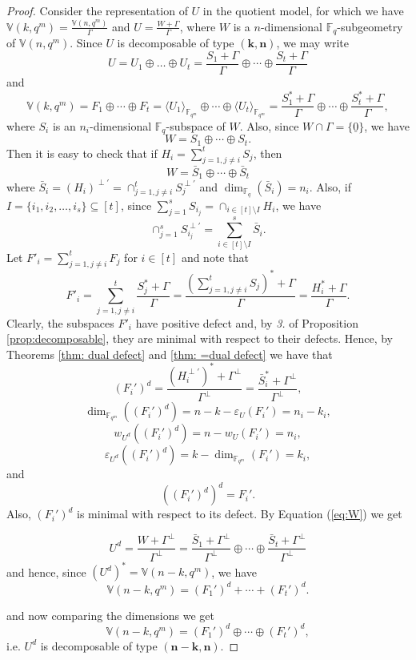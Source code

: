 \documentclass[10pt,a4paper]{amsart}
\newcommand{\fqm}{\mathbb{F}_{q^m}}
\newcommand{\fq}{{\mathbb F}_{q}}
\begin{document}
\begin{proof}
   Consider the representation of $U$ in the quotient model, for which we have $\mathbb{V}(k,q^m)=\frac{\mathbb{V}(n,q^m)}{\Gamma}$ and  $U=\frac{W+\Gamma}{\Gamma}$, where $W$ is a $n$-dimensional $\fq$-subgeometry of $\mathbb{V}(n,q^m)$. Since $U$ is decomposable of type $(\mathbf{k},\mathbf{n})$, we may write
   \[U=U_1\oplus \ldots \oplus U_t=\frac{S_1+\Gamma}{\Gamma}\oplus \cdots \oplus \frac{S_t+\Gamma}{\Gamma}\]
   and 
   \[\mathbb{V}(k,q^m)=F_1\oplus  \cdots \oplus F_t=\langle U_1 \rangle_{\fqm}\oplus \cdots \oplus \langle U_t\rangle_{\fqm}=\frac{S_1^*+\Gamma}{\Gamma}\oplus \cdots \oplus \frac{S_t^*+\Gamma}{\Gamma},\]
   where $S_i$ is an $n_i$-dimensional $\fq$-subspace of $W$.
   Also, since $W\cap \Gamma=\{\underline 0\}$, we have
   \[W=S_1\oplus \cdots \oplus S_t.\]
   Then it is easy to check that if $H_i=\sum_{j=1, j\neq i}^{t}S_j$, then 
   \begin{equation} \label{eq:W}
       W=\bar{S}_1\oplus \cdots \oplus \bar{S}_t
   \end{equation}
   where $\bar{S}_i=(H_i)^{\perp'}=\cap_{j=1, j\neq i}^{t} S_j^{\perp'}$ and $\dim_{\fq}(\bar{S}_i)=n_i$. 
   Also, if $I=\{i_1,i_2,\dots, i_s\} \subseteq [t]$, since $\sum_{j=1}^s S_{i_j}=\cap_{i\in [t]\setminus I} H_i $, we have  
   \begin{equation} \label{Eq:S partial sum}
      \cap_{j=1}^{s}S_{i_j} ^{\perp'}=\sum_{i\in [t]\setminus I}^{s}\bar{S}_i.
   \end{equation}
   Let $F'_i=\sum_{j=1, j\neq i}^{t}F_j$ for $i\in [t]$ and note that 
   \[F'_i=\sum_{j=1, j\neq i}^{t} \frac{S_j^*+\Gamma}{\Gamma}=\frac{(\sum_{j=1, j\neq i}^{t}S_j)^*+\Gamma}{\Gamma}=\frac{H_i^*+\Gamma}{\Gamma}.\]
   Clearly, the subspaces $F'_i$ have positive defect and, by {\it 3.} of Proposition \ref{prop:decomposable}, they are  minimal with respect to their defects. Hence, by Theorems \ref{thm: dual defect} and  \ref{thm: =dual defect} we have that 
   \[(F_i')^d=\frac{(H_i^{\perp'})^*+\Gamma^{\perp}}{\Gamma^{\perp}}=\frac{\bar{S}_i^*+\Gamma^{\perp}}{\Gamma^{\perp}},\]
   \[\dim_{\fqm}((F_i')^d)=n-k-\varepsilon_U(F_i')=n_i-k_i,\] 
   \[ w_{U^d}((F_i')^d)=n-w_U(F_i')=n_i,\] 
   \[\varepsilon_{U^d}((F_i')^d)=k-\dim_{\fqm}(F_i')=k_i,\] 
   and
   \[((F_i')^d)^d=F_i'.\]
   Also, $(F_i')^d$ is minimal with respect to its defect. By Equation (\ref{eq:W}) we get
   
   \begin{equation} \label{eq:decomposition_Ud}
       U^d=\frac{W+\Gamma^{\perp}}{\Gamma^{\perp}}=\frac{\bar{S}_1+\Gamma^{\perp}}{\Gamma^{\perp}}\oplus\cdots\oplus \frac{\bar{S}_t+\Gamma^{\perp}}{\Gamma^{\perp}}
   \end{equation}
   and hence, since $(U^d)^*=\mathbb{V}(n-k,q^m)$, we have
   \[\mathbb{V}(n-k,q^m)=(F_1')^d+\cdots +(F_t')^d.\]
   
and now comparing the dimensions we get
\begin{equation} \label{eq:decomposition_Vd}
\mathbb{V}(n-k,q^m)=(F_1')^d\oplus\cdots \oplus (F_t')^d,
\end{equation}
i.e. $U^d$ is decomposable of type $(\mathbf{n}-\mathbf{k}, \mathbf{n})$.
\end{proof}
\end{document}
